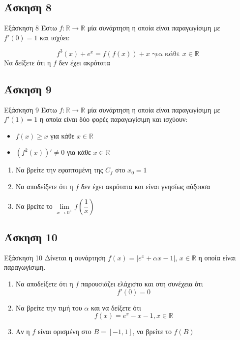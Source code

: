 \documentclass[greek]{beamer}
\begin{document}
\subsection{Άσκηση 8}
\begin{frame}[label=Άσκηση8,t]{Εξάσκηση 8}
Έστω $f:\mathbb{R}\to\mathbb{R}$ μία συνάρτηση η οποία είναι παραγωγίσιμη με $f'(0)=1$ και ισχύει:

$$f^3(x)+e^x=f(f(x))+x \text{ για κάθε } x\in\mathbb{R}$$
Να δείξετε ότι η $f$ δεν έχει ακρότατα

\end{frame}

\subsection{Άσκηση 9}
\begin{frame}[label=Άσκηση9,t]{Εξάσκηση 9}
Έστω $f:\mathbb{R}\to\mathbb{R}$ μία συνάρτηση η οποία είναι παραγωγίσιμη με $f'(1)=1$ η οποία είναι δύο φορές παραγωγίσιμη και ισχύουν:
\begin{itemize}
  \item $f(x)\ge x$ για κάθε $x\in\mathbb{R}$
  \item $\left( f^2(x) \right)'\ne 0$ για κάθε $x\in\mathbb{R}$
\end{itemize}

\begin{enumerate}
  \item<1-> Να βρείτε την εφαπτομένη της $C_f$ στο $x_0=1$
  \item<2-> Να αποδείξετε ότι η $f$ δεν έχει ακρότατα και είναι γνησίως αύξουσα
  \item<3-> Να βρείτε το $\lim\limits_{x \to 0^+}{ f\left( \dfrac{1}{x} \right) }$
\end{enumerate}

\end{frame}

\subsection{Άσκηση 10}
\begin{frame}[label=Άσκηση10,t]{Εξάσκηση 10}
 Δίνεται η συνάρτηση $f(x)=|e^x+αx-1|$, $x\in\mathbb{R}$ η οποία είναι παραγωγίσιμη.
 \begin{enumerate}
   \item<1-> Να αποδείξετε ότι η $f$ παρουσιάζει ελάχιστο και στη συνέχεια ότι
   $$f'(0)=0$$
   \item<2-> Να βρείτε την τιμή του $α$ και να δείξετε ότι
   $$f(x)=e^x-x-1,x\in\mathbb{R}$$
   \item<3-> Αν η $f$ είναι ορισμένη στο $Β=[-1,1]$, να βρείτε το $f(Β)$
 \end{enumerate}

\end{frame}
\end{document}
